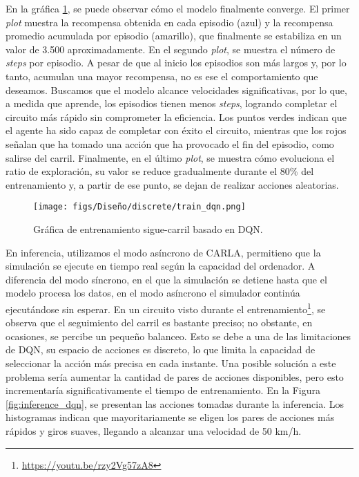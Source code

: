 En la gráfica \ref{fig:train_dqn}, se puede observar cómo el modelo finalmente converge. El primer \textit{plot} muestra la recompensa obtenida en cada episodio (azul) y la recompensa promedio acumulada por episodio (amarillo), que finalmente se estabiliza en un valor de 3.500 aproximadamente. En el segundo \textit{plot}, se muestra el número de \textit{steps} por episodio. A pesar de que al inicio los episodios son más largos y, por lo tanto, acumulan una mayor recompensa, no es ese el comportamiento que deseamos. Buscamos que el modelo alcance velocidades significativas, por lo que, a medida que aprende, los episodios tienen menos \textit{steps}, logrando completar el circuito más rápido sin comprometer la eficiencia. Los puntos verdes indican que el agente ha sido capaz de completar con éxito el circuito, mientras que los rojos señalan que ha tomado una acción que ha provocado el fin del episodio, como salirse del carril. Finalmente, en el último \textit{plot}, se muestra cómo evoluciona el ratio de exploración, su valor se reduce gradualmente durante el 80\% del entrenamiento y, a partir de ese punto, se dejan de realizar acciones aleatorias.
\begin{figure}[ht]
\centering
\texttt{[image: figs/Diseño/discrete/train\_dqn.png]}
\caption{Gráfica de entrenamiento sigue-carril basado en \ac{DQN}.}
\label{fig:train_dqn}
\end{figure}

En inferencia, utilizamos el modo asíncrono de CARLA, permitieno que la simulación se ejecute en tiempo real según la capacidad del ordenador. A diferencia del modo síncrono, en el que la simulación se detiene hasta que el modelo procesa los datos, en el modo asíncrono el simulador continúa ejecutándose sin esperar. En un circuito visto durante el entrenamiento\footnote{\url{https://youtu.be/rzy2Vg57zA8}}, se observa que el seguimiento del carril es bastante preciso; no obstante, en ocasiones, se percibe un pequeño balanceo. Esto se debe a una de las limitaciones de \ac{DQN}, su espacio de acciones es discreto, lo que limita la capacidad de seleccionar la acción más precisa en cada instante. Una posible solución a este problema sería aumentar la cantidad de pares de acciones disponibles, pero esto incrementaría significativamente el tiempo de entrenamiento. En la Figura \ref{fig:inference_dqn}, se presentan las acciones tomadas durante la inferencia. Los histogramas indican que mayoritariamente se eligen los pares de acciones más rápidos y giros suaves, llegando a alcanzar una velocidad de 50 km/h.

